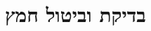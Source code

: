 \documentclass[twoside, openany, parskip=half, 11pt]{book}
\begin{document}
%
%
%
%
%
%
%
%
%
%
%
%
%
%
\chapter[בדיקת וביטול חמץ]{ בדיקת וביטול חמץ }
\end{document}
